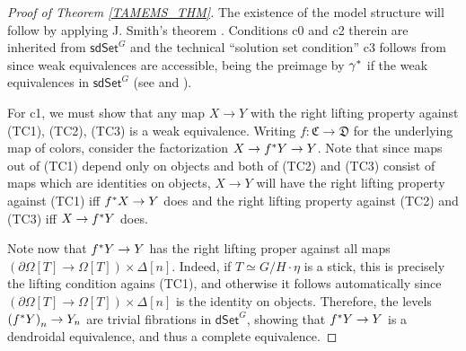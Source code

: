 \documentclass[a4paper,10pt
,draft
]{article}%
\renewcommand{\1}{\eta}%
\begin{document}
\begin{proof}[Proof of Theorem \ref{TAMEMS_THM}]
	The existence of the model structure will follow by applying J. Smith's theorem \cite[Thm. 1.7]{Bek00}. Conditions c0 and c2 therein are inherited from $\mathsf{sdSet}^G$
	and the technical ``solution set condition'' c3 follows from
	\cite[Prop. 1.15]{Bek00} since weak equivalences are accessible, being the preimage by $\gamma^{\**}$ if the weak equivalences in 
	$\mathsf{sdSet}^G$ 
	(see \cite[Cor. A.2.6.5]{Lur09} and \cite[Cor. A.2.6.6]{Lur09}).
	
	For c1, we must show that any map $X \to Y$ with the right lifting property against (TC1), (TC2), (TC3) is a weak equivalence.
	Writing $f \colon \mathfrak{C} \to \mathfrak{D}$ for the underlying map of colors,
	consider the factorization $X \to f^{\**}Y \to Y$.
	Note that since maps out of (TC1) depend only on objects and both of (TC2) and (TC3) consist of maps which are identities on objects,
	$X \to Y$ will have the right lifting property against (TC1) iff 
	$f^{\**} X \to Y$ does
	and the right lifting property against 
	(TC2) and (TC3) iff $X \to f^{\**}Y$ does.
	
Note now that $f^{\**} Y \to Y$ has the right lifting proper against all maps 
	$\left(\partial \Omega[T] \to \Omega[T] \right) \times \Delta[n]$.
	Indeed, if $T \simeq G/H \cdot \eta$ is a stick, this is precisely the lifting condition agains (TC1), and otherwise it follows automatically since $\left(\partial \Omega[T] \to \Omega[T] \right) \times \Delta[n]$ is the identity on objects.
	Therefore, the levels 
	$\left(f^{\**} Y \right)_n \to Y_n$ are trivial fibrations in 
	$\mathsf{dSet}^G$, showing that 
	$f^{\**} Y \to Y$ is a dendroidal equivalence, 
	and thus a complete equivalence. 
	

\end{proof}
\end{document}
